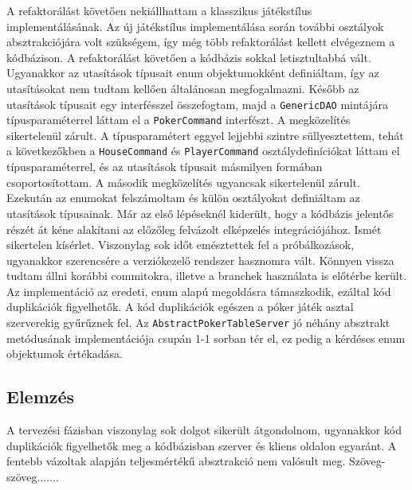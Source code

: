 A refaktorálást követően nekiállhattam a klasszikus játékstílus implementálásának. Az új játékstílus implementálása során további osztályok absztrakciójára volt szükségem, így még több refaktorálást kellett elvégeznem a kódbázison. A refaktorálást követően a kódbázis sokkal letisztultabbá vált. Ugyanakkor az utasítások típusait enum objektumokként definiáltam, így az utasításokat nem tudtam kellően általánosan megfogalmazni. Később az utasítások típusait egy interfésszel összefogtam, majd a \texttt{GenericDAO} mintájára típusparaméterrel láttam el a \texttt{PokerCommand} interfészt. A megközelítés sikertelenül zárult. A típusparamétert eggyel lejjebbi szintre süllyesztettem, tehát a következőkben a \texttt{HouseCommand} és \texttt{PlayerCommand} osztálydefiníciókat láttam el típusparaméterrel, és az utasítások típusait másmilyen formában csoportosítottam. A második megközelítés ugyancsak sikertelenül zárult. Ezekután az enumokat felszámoltam és külön osztályokat definiáltam az utasítások típusainak. Már az első lépéseknél kiderült, hogy a kódbázis jelentős részét át kéne alakítani az előzőleg felvázolt elképzelés integrációjához. Ismét sikertelen kísérlet. Viszonylag sok időt emésztettek fel a próbálkozások, ugyanakkor szerencsére a verziókezelő rendszer hasznomra vált. Könnyen vissza tudtam állni korábbi commitokra, illetve a branchek használata is előtérbe került. \\
Az implementáció az eredeti, enum alapú megoldásra támaszkodik, ezáltal kód duplikációk figyelhetők. A kód duplikációk egészen a póker játék asztal szerverekig  gyűrűznek fel. Az \texttt{AbstractPokerTableServer} jó néhány absztrakt metódusának implementációja csupán 1-1 sorban tér el, ez pedig a kérdéses enum objektumok értékadása.

\subsection{Elemzés}
A tervezési fázisban viszonylag sok dolgot sikerült átgondolnom, ugyanakkor kód duplikációk figyelhetők meg a kódbázisban szerver és kliens oldalon egyaránt. A fentebb vázoltak alapján teljesmértékű absztrakció nem valósult meg. Szöveg-szöveg.......

